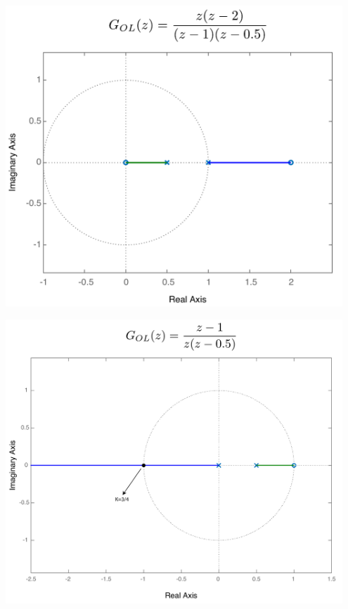 \documentclass[twoside]{article}
\begin{document}
\begin{minipage}[h]{0.5\linewidth}
    \begin{center}
      \includegraphics[width=0.95\textwidth]{E1}
    \end{center}
\end{minipage}
\begin{minipage}[h]{0.5\linewidth}
    \begin{center}
      \includegraphics[width=0.95\textwidth]{E2}
    \end{center}
\end{minipage}
\end{document}
